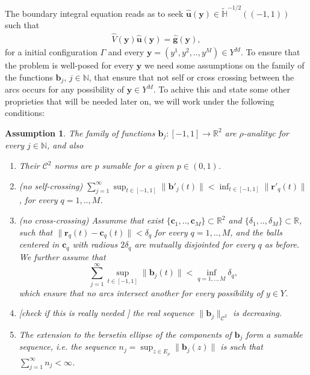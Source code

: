 \documentclass{article}
\newtheorem{assumption}[theorem]{Assumption}
\newcommand{\todo}[1]{{\color{red}[#1]}}
\newcommand{\IN}{{\mathbb N}}
\newcommand{\IR}{{\mathbb R}}
\begin{document}
The boundary integral equation reads as to seek $\widehat{\mathbf{u}}(\mathbf{y}) \in \widetilde{\mathbb{H}}^{-1/2}((-1,1))$ such that 
\begin{align}
\label{eq:stcsbie}
\widehat{V}(\mathbf{y})\widehat{\mathbf{u}}(\mathbf{y})  = \widehat{\mathbf{g}}(\mathbf{y}), 
\end{align}
for a initial configuration $\Gamma$ and every $\mathbf{y} = (y^1,y^2,..,y^M) \in Y^M$. To ensure that the problem is well-posed for every $\mathbf{y}$ we need some assumptions on the family of the functions $\mathbf{b}_j$, $j \in \IN$, that ensure that not self or cross crossing between the arcs occurs for any possibility of $\mathbf{y} \in Y^M$.  To achive this and state some other proprieties that will be needed later on, we will work under the following conditions:  

\begin{assumption}
\label{ass:nocross} The family of functions $\mathbf{b}_j : [-1,1] \rightarrow \IR^2$ are $\rho$-analityc for every $j \in \IN$, and also 
\begin{enumerate}
\item
Their $\mathbf{\mathcal{C}}^2$ norms are $p$ sumable for a given $p \in (0,1)$. 
\item (no self-crossing) 
$\sum_{j=1}^\infty  \sup_{t \in [-1,1]}\| \mathbf{b}'_j(t) \| < \inf_{t \in [-1,1]}\| \mathbf{r}'_q(t)\|$, for every $q =1,..,M$.  
\item 
(no cross-crossing)
Assumme that exist $\{\mathbf{c}_1,..,\mathbf{c}_M \} \subset \IR^2$ and $\{ \delta_1,.., \delta_M\} \subset \IR$, such that 
$\|\mathbf{r}_q(t) - \mathbf{c}_q(t)\| < \delta_q$ for every $q =1,..,M$, and the balls centered in $\mathbf{c}_q$ with radious $2\delta_q$ are mutually disjointed for every $q$ as before. We further assume that 
$$\sum_{j=1}^\infty \sup_{t \in [-1,1]} \| \mathbf{b}_j(t)\|  < \inf_{q=1,..,M}\delta_q,$$
which ensure that no arcs intersect another for every possibility of $y \in Y$.  
\item 
\todo{check if this is really needed } the real sequence $\|\mathbf{b}_j\|_{\mathbf{\mathcal{C}}^2}$ is decreasing. 
\item 
The extension to the bersetin ellipse of the components of $\mathbf{b}_j$ form a sumable sequence, i.e. the sequence $n_j = \sup_{z \in E_\rho} \| \mathbf{b}_j (z) \|$ is such that $\sum_{j=1}^\infty n_j < \infty$. 
\end{enumerate}
\end{assumption}
\end{document}
